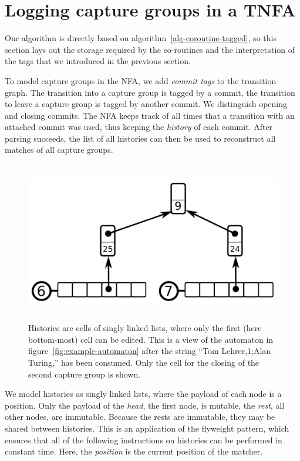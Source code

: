 \documentclass[11pt,a4paper,twoside,openright]{Thesis}
\theoremstyle{definition}
\newcommand{\Figref}[1]{figure~\ref{fig:#1}}
\newcommand{\seclabel}[1]{\label{sec:#1}}
\begin{document}
\section{Logging capture groups in a TNFA}\seclabel{tnfa}

Our algorithm is directly based on algorithm~\ref{alg-coroutine-tagged}, so 
this section lays out the storage required by the co-routines and the
interpretation of the tags that we introduced in the previous section.

To model capture groups in the NFA, we add \emph{commit tags} to
the transition graph. The transition into a capture group is tagged
by a commit, the transition to leave a capture group is tagged by
another commit. We distinguish opening and closing commits. The
NFA keeps track of all times that a transition with an attached
commit was used, thus keeping the \emph{history} of each commit.
After parsing succeeds, the list of all histories can then be used
to reconstruct all matches of all capture groups.

\begin{figure}[htpb]
  \centering
  \includegraphics[height=7cm]{graphs/cells}
  \caption{Histories are cells of singly linked lists, where only the first 
    (here bottom-most) cell can be edited. This is a view of the automaton in 
    \Figref{example-automaton} after the string ``Tom Lehrer,1;Alan 
  Turing,'' has been consumed. Only the cell for the closing of the second 
capture group is shown.}
  \label{fig:cells}
\end{figure}

We model histories as singly linked lists, where the payload of each node is a
position.  Only the payload of the \emph{head}, the first node, is mutable, the
\emph{rest}, all other nodes, are immutable.  Because the rests are immutable,
they may be shared between histories.  This is an application of the flyweight
pattern, which ensures that all of the following instructions on histories can
be performed in constant time. Here, the \emph{position} is the current
position of the matcher.
\end{document}
